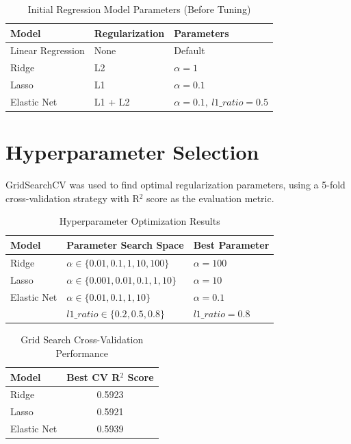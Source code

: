 \documentclass[12pt,a4paper]{article}
\begin{document}
\begin{table}[H]
\centering
\begin{tabular}{lll}
\toprule
Model & Regularization & Parameters \\
\midrule
Linear Regression & None & Default \\
Ridge & L2 & $\alpha = 1$ \\
Lasso & L1 & $\alpha = 0.1$ \\
Elastic Net & L1 + L2 & $\alpha = 0.1,\ l1\_ratio = 0.5$ \\
\bottomrule
\end{tabular}
\caption{Initial Regression Model Parameters (Before Tuning)}
\end{table}

\section{Hyperparameter Selection}

GridSearchCV was used to find optimal regularization parameters, using a 5-fold cross-validation strategy with R$^2$ score as the evaluation metric.

\begin{table}[H]
\centering
\begin{tabular}{lll}
\toprule
Model & Parameter Search Space & Best Parameter \\
\midrule
Ridge & $\alpha \in \{0.01,0.1,1,10,100\}$ & $\alpha = 100$ \\
Lasso & $\alpha \in \{0.001,0.01,0.1,1,10\}$ & $\alpha = 10$ \\
Elastic Net & $\alpha \in \{0.01,0.1,1,10\}$ & $\alpha = 0.1$ \\
 & $l1\_ratio \in \{0.2,0.5,0.8\}$ & $l1\_ratio = 0.8$ \\
\bottomrule
\end{tabular}
\caption{Hyperparameter Optimization Results}
\end{table}

\begin{table}[H]
\centering
\begin{tabular}{lc}
\toprule
Model & Best CV R$^2$ Score \\
\midrule
Ridge & 0.5923 \\
Lasso & 0.5921 \\
Elastic Net & 0.5939 \\
\bottomrule
\end{tabular}
\caption{Grid Search Cross-Validation Performance}
\end{table}
\end{document}

